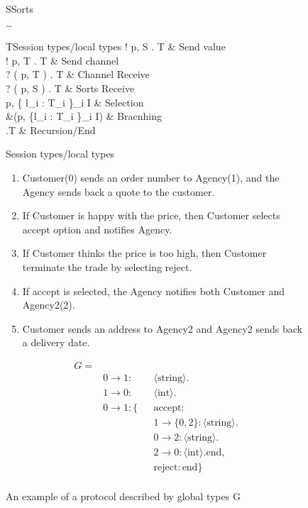 \begin{figure}[ht]
\begin{grammar}{S\Coloneqq}{Sorts}
   \mid {} \mid {} \\
  \dots\\
\end{grammar}
\hfill
\begin{grammar}{T\Coloneqq}{Session types/local types}
  ! \langle p, S \rangle . T & Send value\\
  ! \langle p, T \rangle . T & Send channel\\
  ? ( p, T ) . T & Channel Receive\\
  ? ( p, S ) . T & Sorts Receive\\
  \oplus \langle p, \{ l_i : T_i \}_{i \in I} \rangle & Selection \\
  \&(p, \{l_i : T_i \}_{i \in I}) & Bracnhing \\
  \mu {}.T  \mid {} \mid {} & Recursion/End
\end{grammar}
\caption{Session types/local types} \label{b:mpst:lt}
\end{figure}
\begin{figure}[ht]
  \begin{minipage}{0.45\textwidth}
    \begin{enumerate}
      \item Customer(0) sends an order number to Agency(1), and the Agency sends back a quote to the customer.
      \item If Customer is happy with the price, then Customer selects accept option and notifies Agency.
      \item If Customer thinks the price is too high, then Customer terminate the trade by selecting reject.
      \item If accept is selected, the Agency notifies both Customer and Agency2(2). 
      \item Customer sends an address to Agency2 and Agency2 sends back a delivery date.
    \end{enumerate}
  \end{minipage}
  \hfill
  \begin{minipage}{0.45\textwidth}
    \begin{align*}
      G = \\
      & 0 \rightarrow 1: && \langle \text{string} \rangle .\\
      & 1 \rightarrow 0: && \langle \text{int} \rangle .\\
      & 0 \rightarrow 1: \{ && \text{accept}: \\
      & && 1 \rightarrow \{ 0, 2 \}: \langle \text{string} \rangle . \\
      & &&  0 \rightarrow 2: \langle \text{string} \rangle .\\
      & &&  2 \rightarrow 0: \langle \text{int} \rangle . \text{end}, \\
      & && \text{reject}: \text{end} \} \\
    \end{align*}
  \end{minipage}
  \caption{An example of a protocol described by global types G}
  \label{b:mpst:gtex}
\end{figure}
